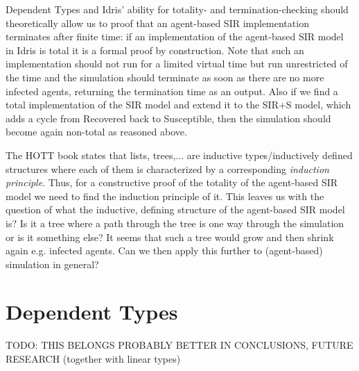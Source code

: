 Dependent Types and Idris' ability for totality- and termination-checking should theoretically allow us to proof that an agent-based SIR implementation terminates after finite time: if an implementation of the agent-based SIR model in Idris is total it is a formal proof by construction. Note that such an implementation should not run for a limited virtual time but run unrestricted of the time and the simulation should terminate as soon as there are no more infected agents, returning the termination time as an output. Also if we find a total implementation of the SIR model and extend it to the SIR+S model, which adds a cycle from Recovered back to Susceptible, then the simulation should become again non-total as reasoned above.

The HOTT book \cite{program_homotopy_2013} states that lists, trees,... are inductive types/inductively defined structures where each of them is characterized by a corresponding \textit{induction principle}. Thus, for a constructive proof of the totality of the agent-based SIR model we need to find the induction principle of it. This leaves us with the question of what the inductive, defining structure of the agent-based SIR model is? Is it a tree where a path through the tree is one way through the simulation or is it something else? It seems that such a tree would grow and then shrink again e.g. infected agents. Can we then apply this further to (agent-based) simulation in general?


%
%

\section{Dependent Types}
TODO: THIS BELONGS PROBABLY BETTER IN CONCLUSIONS, FUTURE RESEARCH (together with linear types)

